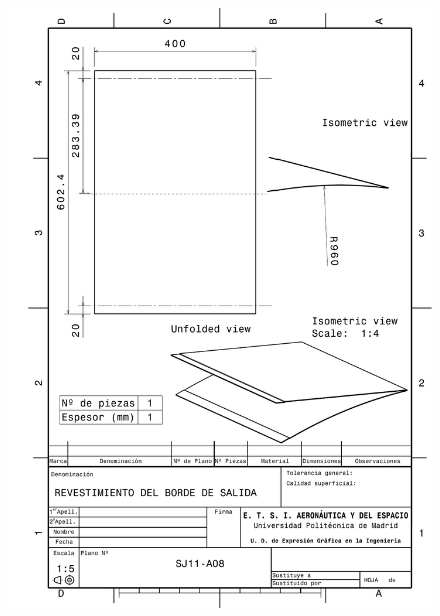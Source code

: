 \begin{figure}
    \centering
    \includegraphics[width=\linewidth]{Figures//Planos/RBS.pdf}
\end{figure}

